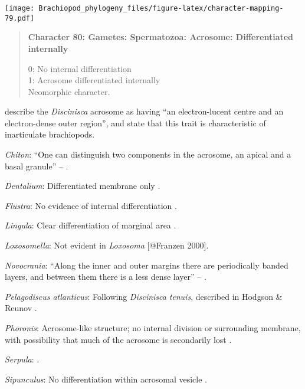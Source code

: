 \documentclass[openany]{book}
\theoremstyle{definition}
\theoremstyle{definition}
\theoremstyle{definition}
\theoremstyle{remark}
\begin{document}
\texttt{[image: Brachiopod\_phylogeny\_files/figure-latex/character-mapping-79.pdf]}

\begin{quote}
\textbf{Character 80: Gametes: Spermatozoa: Acrosome: Differentiated
internally}

0: No internal differentiation\\
1: Acrosome differentiated internally\\
Neomorphic character.
\end{quote}

\citet{Hodgson1994Ultrastructureof} describe the \emph{Discinisca}
acrosome as having ``an electron-lucent centre and an electron-dense
outer region'', and state that this trait is characteristic of
inarticulate brachiopods.

\hypertarget{Chiton-coding-80}{}
\emph{Chiton}: ``One can distinguish two components in the acrosome, an
apical and a basal granule'' -- \citet{BucklandNicks1988}.

\hypertarget{Dentalium-coding-80}{}
\emph{Dentalium}: Differentiated membrane only \citep{DufresneDube1983}.

\hypertarget{Flustra-coding-80}{}
\emph{Flustra}: No evidence of internal differentiation \citep[in
\emph{Tubulipora};][]{Franzen1984}.

\hypertarget{Lingula-coding-80}{}
\emph{Lingula}: Clear differentiation of marginal area
\citep{Fukumoto2003Theacrosome}.

\hypertarget{Loxosomella-coding-80}{}
\emph{Loxosomella}: Not evident in \emph{Loxosoma} {[}@Franzen 2000{]}.

\hypertarget{Novocrania-coding-80}{}
\emph{Novocrania}: ``Along the inner and outer margins there are
periodically banded layers, and between them there is a less dense
layer'' -- \citet{Afzelius1978Finestructure}.

\hypertarget{Pelagodiscus_atlanticus-coding-80}{}
\emph{Pelagodiscus atlanticus}: Following \emph{Discinisca}
\emph{tenuis}, described in Hodgson \& Reunov
\citeyearpar{Hodgson1994Ultrastructureof}.

\hypertarget{Phoronis-coding-80}{}
\emph{Phoronis}: Acrosome-like structure; no internal division or
surrounding membrane, with possibility that much of the acrosome is
secondarily lost \citep{Reunov2004Ultrastructuralstudy}.

\hypertarget{Serpula-coding-80}{}
\emph{Serpula}: \citet{Gherardi2011}.

\hypertarget{Sipunculus-coding-80}{}
\emph{Sipunculus}: No differentiation within acrosomal vesicle
\citep{Rice1993}.
\end{document}
